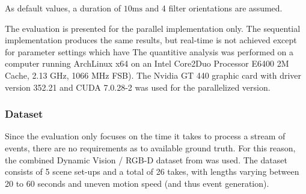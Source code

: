 As default values, a duration of $10\mathrm{ms}$ and 4 filter orientations are assumed.

The evaluation is presented for the parallel implementation only.
The sequential implementation produces the same results, but real-time is not achieved except for parameter settings which have 
The quantitive analysis was performed on a computer running ArchLinux x64 on an Intel Core2Duo Processor E6400 2M Cache, 2.13 GHz, 1066 MHz FSB).
The Nvidia GT 440 graphic card with driver version 352.21 and CUDA 7.0.28-2 was used for the parallelized version.

\subsubsection{Dataset}
Since the evaluation only focuses on the time it takes to process a stream of events, there are no requirements as to available ground truth.
For this reason, the combined Dynamic Vision / RGB-D dataset from \cite{weikersdorfer2014event} was used.
The dataset consists of 5 scene set-ups and a total of 26 takes, with lengths varying between 20 to 60 seconds and uneven motion speed (and thus event generation).

